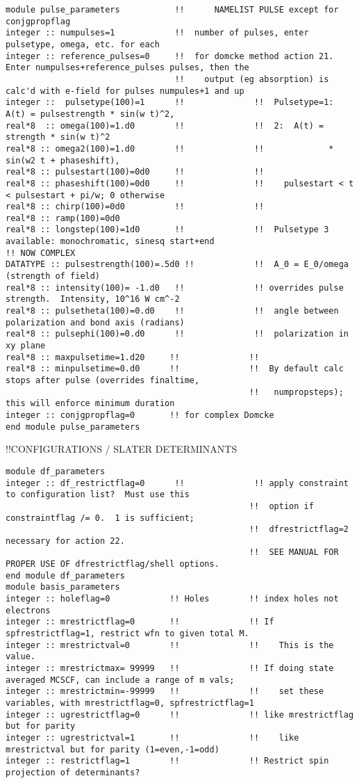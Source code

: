 \begin{verbatim}
module pulse_parameters           !!      NAMELIST PULSE except for conjgpropflag
integer :: numpulses=1            !!  number of pulses, enter pulsetype, omega, etc. for each
integer :: reference_pulses=0     !!  for domcke method action 21. Enter numpulses+reference_pulses pulses, then the
                                  !!    output (eg absorption) is calc'd with e-field for pulses numpules+1 and up
integer ::  pulsetype(100)=1      !!              !!  Pulsetype=1:  A(t) = pulsestrength * sin(w t)^2,
real*8  :: omega(100)=1.d0        !!              !!  2:  A(t) = strength * sin(w t)^2 
real*8 :: omega2(100)=1.d0        !!              !!             * sin(w2 t + phaseshift),
real*8 :: pulsestart(100)=0d0     !!              !!   
real*8 :: phaseshift(100)=0d0     !!              !!    pulsestart < t < pulsestart + pi/w; 0 otherwise
real*8 :: chirp(100)=0d0          !!              !!
real*8 :: ramp(100)=0d0
real*8 :: longstep(100)=1d0       !!              !!  Pulsetype 3 available: monochromatic, sinesq start+end
!! NOW COMPLEX
DATATYPE :: pulsestrength(100)=.5d0 !!            !!  A_0 = E_0/omega (strength of field)  
real*8 :: intensity(100)= -1.d0   !!              !! overrides pulse strength.  Intensity, 10^16 W cm^-2 
real*8 :: pulsetheta(100)=0.d0    !!              !!  angle between polarization and bond axis (radians)
real*8 :: pulsephi(100)=0.d0      !!              !!  polarization in xy plane
real*8 :: maxpulsetime=1.d20     !!              !!  
real*8 :: minpulsetime=0.d0      !!              !!  By default calc stops after pulse (overrides finaltime,
                                                 !!   numpropsteps); this will enforce minimum duration
integer :: conjgpropflag=0       !! for complex Domcke
end module pulse_parameters
\end{verbatim}
!!{\large \quad CONFIGURATIONS / SLATER DETERMINANTS}
\begin{verbatim}
module df_parameters
integer :: df_restrictflag=0      !!              !! apply constraint to configuration list?  Must use this
                                                 !!  option if constraintflag /= 0.  1 is sufficient;
                                                 !!  dfrestrictflag=2 necessary for action 22. 
                                                 !!  SEE MANUAL FOR PROPER USE OF dfrestrictflag/shell options.
end module df_parameters
module basis_parameters
integer :: holeflag=0            !! Holes        !! index holes not electrons
integer :: mrestrictflag=0       !!              !! If spfrestrictflag=1, restrict wfn to given total M.
integer :: mrestrictval=0        !!              !!    This is the value.
integer :: mrestrictmax= 99999   !!              !! If doing state averaged MCSCF, can include a range of m vals;
integer :: mrestrictmin=-99999   !!              !!    set these variables, with mrestrictflag=0, spfrestrictflag=1
integer :: ugrestrictflag=0      !!              !! like mrestrictflag but for parity
integer :: ugrestrictval=1       !!              !!    like mrestrictval but for parity (1=even,-1=odd)
integer :: restrictflag=1        !!              !! Restrict spin projection of determinants?
\end{verbatim}
